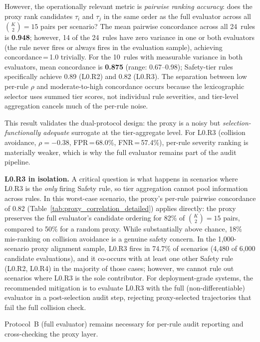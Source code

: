 However, the operationally relevant metric is \emph{pairwise ranking accuracy}: does the proxy rank candidates $\tau_i$ and $\tau_j$ in the same order as the full evaluator across all $\binom{K}{2}{=}15$ pairs per scenario?  The mean pairwise concordance across all 24~rules is \textbf{0.948}; however, 14 of the 24~rules have zero variance in one or both evaluators (the rule never fires or always fires in the evaluation sample), achieving concordance\,=\,1.0 trivially.  For the 10~rules with measurable variance in both evaluators, mean concordance is \textbf{0.875} (range: 0.67--0.98); Safety-tier rules specifically achieve 0.89 (L0.R2) and 0.82 (L0.R3).  The separation between low per-rule $\rho$ and moderate-to-high concordance occurs because the lexicographic selector uses summed tier scores, not individual rule severities, and tier-level aggregation cancels much of the per-rule noise.

This result validates the dual-protocol design: the proxy is a noisy but \emph{selection-functionally adequate} surrogate at the tier-aggregate level.  For L0.R3 (collision avoidance, $\rho{=}{-}0.38$, FPR\,=\,68.0\%, FNR\,=\,57.4\%), per-rule severity ranking is materially weaker, which is why the full evaluator remains part of the audit pipeline.

\noindent\textbf{L0.R3 in isolation.}  A critical question is what happens in scenarios where L0.R3 is the \emph{only} firing Safety rule, so tier aggregation cannot pool information across rules.  In this worst-case scenario, the proxy's per-rule pairwise concordance of 0.82 (Table~\ref{tab:proxy_correlation_detailed}) applies directly: the proxy preserves the full evaluator's candidate ordering for 82\% of $\binom{K}{2}{=}15$ pairs, compared to 50\% for a random proxy.  While substantially above chance, 18\% mis-ranking on collision avoidance is a genuine safety concern.  In the 1{,}000-scenario proxy alignment sample, L0.R3 fires in 74.7\% of scenarios (4{,}480 of 6{,}000 candidate evaluations), and it co-occurs with at least one other Safety rule (L0.R2, L0.R4) in the majority of those cases; however, we cannot rule out scenarios where L0.R3 is the sole contributor.  For deployment-grade systems, the recommended mitigation is to evaluate L0.R3 with the full (non-differentiable) evaluator in a post-selection audit step, rejecting proxy-selected trajectories that fail the full collision check.

Protocol~B (full evaluator) remains necessary for per-rule audit reporting and cross-checking the proxy layer.

